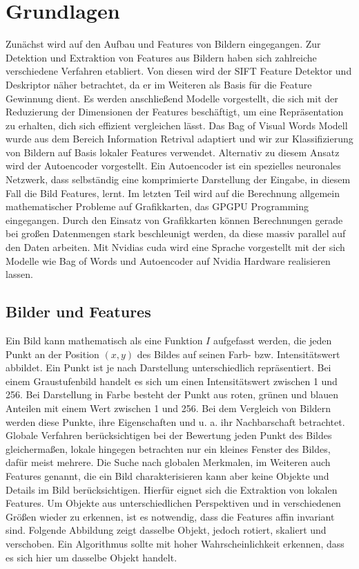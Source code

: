 \chapter{Grundlagen}

Zunächst wird auf den Aufbau und Features von Bildern eingegangen. Zur Detektion und Extraktion von Features aus Bildern haben sich zahlreiche verschiedene Verfahren etabliert. Von diesen wird der SIFT Feature Detektor und Deskriptor näher betrachtet, da er im Weiteren als Basis für die Feature Gewinnung dient. Es werden anschließend Modelle vorgestellt, die sich mit der Reduzierung der Dimensionen der Features beschäftigt, um eine Repräsentation zu erhalten, dich sich effizient vergleichen lässt. Das Bag of Visual Words Modell wurde aus dem Bereich Information Retrival adaptiert und wir zur Klassifizierung von Bildern auf Basis lokaler Features verwendet. Alternativ zu diesem Ansatz wird der Autoencoder vorgestellt. Ein Autoencoder ist ein spezielles neuronales Netzwerk, dass selbständig eine komprimierte Darstellung der Eingabe, in diesem Fall die Bild Features, lernt. Im letzten Teil wird auf die Berechnung allgemein mathematischer Probleme auf Grafikkarten, das GPGPU Programming eingegangen. Durch den Einsatz von Grafikkarten können Berechnungen gerade bei großen Datenmengen stark beschleunigt werden, da diese massiv parallel auf den Daten arbeiten. Mit Nvidias cuda wird eine Sprache vorgestellt mit der sich Modelle wie Bag of Words und Autoencoder auf Nvidia Hardware realisieren lassen.

\section{Bilder und Features}

Ein Bild kann mathematisch als eine Funktion $I$ aufgefasst werden, die jeden Punkt an der Position $(x, y)$ des Bildes auf seinen Farb- bzw. Intensitätswert abbildet. Ein Punkt ist je nach Darstellung unterschiedlich repräsentiert. Bei einem Graustufenbild handelt es sich um einen Intensitätswert zwischen 1 und 256. Bei Darstellung in Farbe besteht der Punkt aus roten, grünen und blauen Anteilen mit einem Wert zwischen 1 und 256. Bei dem Vergleich von Bildern werden diese Punkte, ihre Eigenschaften und u. a. ihr Nachbarschaft betrachtet. Globale Verfahren berücksichtigen bei der Bewertung jeden Punkt des Bildes gleichermaßen, lokale hingegen betrachten nur ein kleines Fenster des Bildes, dafür meist mehrere. Die Suche nach globalen Merkmalen, im Weiteren auch Features genannt, die ein Bild charakterisieren kann aber keine Objekte und Details im Bild berücksichtigen. Hierfür eignet sich die Extraktion von lokalen Features. Um Objekte aus unterschiedlichen Perspektiven und in verschiedenen Größen wieder zu erkennen, ist es notwendig, dass die Features affin invariant sind. Folgende Abbildung zeigt dasselbe Objekt, jedoch rotiert, skaliert und verschoben. Ein Algorithmus sollte mit hoher Wahrscheinlichkeit erkennen, dass es sich hier um dasselbe Objekt handelt.

